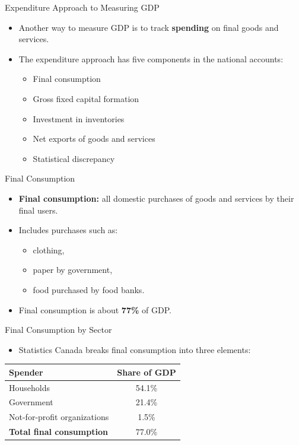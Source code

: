 \documentclass[aspectratio=169]{beamer}
\begin{document}
\begin{frame}{Expenditure Approach to Measuring GDP}
\transfade
\begin{itemize}
  \item Another way to measure GDP is to track \textbf{spending} on final goods and services.
  \item The expenditure approach has \alert{five components} in the national accounts:
  \begin{itemize}
    \item Final consumption
    \item Gross fixed capital formation
    \item Investment in inventories
    \item Net exports of goods and services
    \item Statistical discrepancy
  \end{itemize}
\end{itemize}
\end{frame}

\begin{frame}{Final Consumption}
\transfade
\begin{itemize}
  \item \textbf{Final consumption:} all domestic purchases of goods and services by their final users.
  \item Includes purchases such as:
  \begin{itemize}
    \item clothing,
    \item paper by government,
    \item food purchased by food banks.
  \end{itemize}
  \item Final consumption is about \textbf{77\%} of GDP.
\end{itemize}
\end{frame}

\begin{frame}{Final Consumption by Sector}
\transfade
\small
\begin{itemize}
  \item Statistics Canada breaks final consumption into three elements:
\end{itemize}
\begin{tabular}{l c}
\toprule
\textbf{Spender} & \textbf{Share of GDP} \\
\midrule
Households & 54.1\% \\
Government & 21.4\% \\
Not-for-profit organizations & 1.5\% \\
\midrule
\textbf{Total final consumption} & 77.0\% \\
\bottomrule
\end{tabular}
\end{frame}
\end{document}
